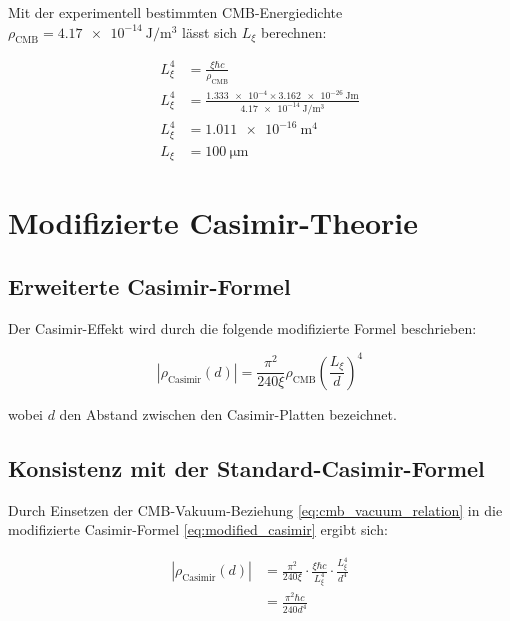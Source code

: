 	Mit der experimentell bestimmten CMB-Energiedichte \( \rho_{\text{CMB}} = \SI{4.17e-14}{\joule\per\meter^3} \) lässt sich \( L_\xi \) berechnen:
	
	\begin{align}
		L_\xi^4 &= \frac{\xi \hbar c}{\rho_{\text{CMB}}} \label{eq:Lxi_calculation}\\
		L_\xi^4 &= \frac{\num{1.333e-4} \times \SI{3.162e-26}{\joule\meter}}{\SI{4.17e-14}{\joule\per\meter^3}}\\
		L_\xi^4 &= \SI{1.011e-16}{\meter^4}\\
		L_\xi &= \SI{100}{\micro\meter} \label{eq:Lxi_result}
	\end{align}
	
	\section{Modifizierte Casimir-Theorie}
	
	\subsection{Erweiterte Casimir-Formel}
	
	Der Casimir-Effekt wird durch die folgende modifizierte Formel beschrieben:
	
	\begin{equation}
		|\rho_{\text{Casimir}}(d)| = \frac{\pi^2}{240\xi} \rho_{\text{CMB}} \left( \frac{L_\xi}{d} \right)^4 \label{eq:modified_casimir}
	\end{equation}
	
	wobei \( d \) den Abstand zwischen den Casimir-Platten bezeichnet.
	
	\subsection{Konsistenz mit der Standard-Casimir-Formel}
	
	Durch Einsetzen der CMB-Vakuum-Beziehung \eqref{eq:cmb_vacuum_relation} in die modifizierte Casimir-Formel \eqref{eq:modified_casimir} ergibt sich:
	
	\begin{align}
		|\rho_{\text{Casimir}}(d)| &= \frac{\pi^2}{240\xi} \cdot \frac{\xi \hbar c}{L_\xi^4} \cdot \frac{L_\xi^4}{d^4} \label{eq:casimir_substitution}\\
		&= \frac{\pi^2 \hbar c}{240 d^4} \label{eq:standard_casimir_recovered}
	\end{align}
	
